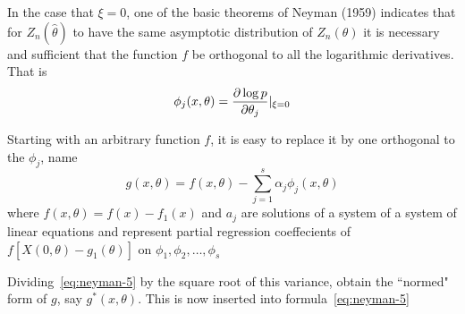 In the case that \(\xi=0\), one of the basic theorems of Neyman (1959) indicates that for \(Z_n(\hat\theta)\) to have the same asymptotic distribution of  \(Z_n(\theta)\) it is necessary and sufficient that the function  \(f\) be orthogonal to all the logarithmic derivatives. That is 
\begin{equation}
	\label{eq:neyman-4}
	\phi_j(x,\theta) = \frac{\partial \log p}{\partial \theta_j}\large|_{\xi=0} 
\end{equation}

Starting with an arbitrary function \(f\), it is easy to replace it by one orthogonal to the \(\phi_j\), name 
 \begin{equation}
	\label{eq:neyman-5}
	g(x,\theta) = f(x,\theta)-\sum_{j=1}^s \alpha_j\phi_j(x,\theta)
\end{equation}
where \(f(x,\theta) = f(x)-f_1(x)\) and $a_j$ are solutions of a system of a system of linear equations and represent partial regression coeffecients of  $f[X(0,\theta)-g_1(\theta)]$ on \(\phi_1,\phi_2,\dots,\phi_s\)

Dividing~\eqref{eq:neyman-5} by the square root of this variance, obtain the ``normed" form of \(g\), say \(g^*(x,\theta)\). This is now inserted into formula~\eqref{eq:neyman-5}


